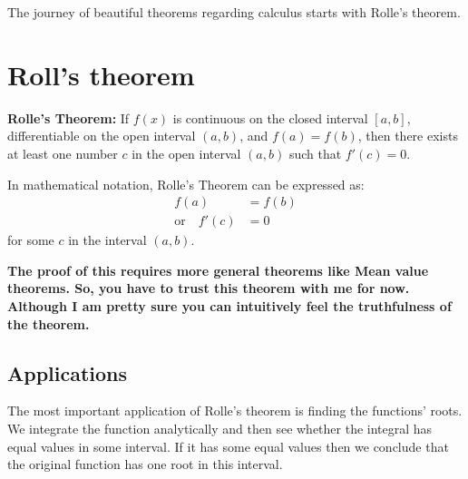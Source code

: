 The journey of beautiful theorems regarding calculus starts with Rolle's theorem. 

\section{Roll's theorem}

\textbf{Rolle's Theorem:} If $f(x)$ is continuous on the closed interval $[a, b]$, differentiable on the open interval $(a, b)$, and $f(a) = f(b)$, then there exists at least one number $c$ in the open interval $(a, b)$ such that $f'(c) = 0$.

In mathematical notation, Rolle's Theorem can be expressed as:
\begin{align*}
    f(a) &= f(b) \\
    \text{or} \quad f'(c) &= 0
\end{align*}
for some $c$ in the interval $(a, b)$.

\textbf{The proof of this requires more general theorems like Mean value theorems. So, you have to trust this theorem with me for now. Although I am pretty sure you can intuitively feel the truthfulness of the theorem.}


\subsection{Applications}

The most important application of Rolle's theorem is finding the functions' roots. We integrate the function analytically and then see whether the integral has equal values in some interval. If it has some equal values then we conclude that the original function has one root in this interval. 


